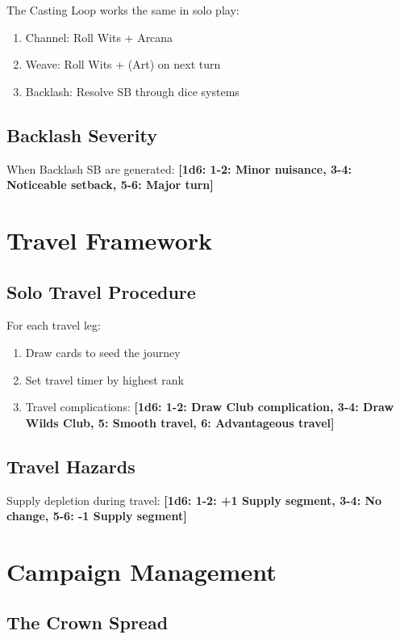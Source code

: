 \documentclass[11pt]{article}
\newcommand{\dice}[1]{\textbf{[1d6: #1]}}
\begin{document}
The Casting Loop works the same in solo play:
\begin{enumerate}
    \item Channel: Roll Wits + Arcana
    \item Weave: Roll Wits + (Art) on next turn
    \item Backlash: Resolve SB through dice systems
\end{enumerate}

\subsection{Backlash Severity}

When Backlash SB are generated:
\dice{1-2: Minor nuisance, 3-4: Noticeable setback, 5-6: Major turn}

\section{Travel Framework}

\subsection{Solo Travel Procedure}

For each travel leg:
\begin{enumerate}
    \item Draw cards to seed the journey
    \item Set travel timer by highest rank
    \item Travel complications:
    \dice{1-2: Draw Club complication, 3-4: Draw Wilds Club, 5: Smooth travel, 6: Advantageous travel}
\end{enumerate}

\subsection{Travel Hazards}

Supply depletion during travel:
\dice{1-2: +1 Supply segment, 3-4: No change, 5-6: -1 Supply segment}

\section{Campaign Management}

\subsection{The Crown Spread}
\end{document}
